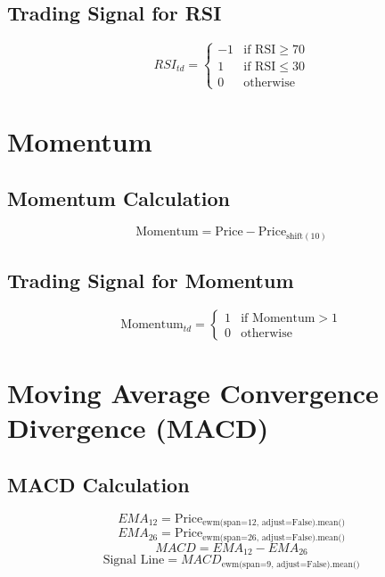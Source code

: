 \documentclass{article}
\begin{document}
\subsection{Trading Signal for RSI}
\begin{equation}
RSI_{td} = 
\begin{cases} 
-1 & \text{if RSI} \geq 70 \\
1 & \text{if RSI} \leq 30 \\
0 & \text{otherwise}
\end{cases}
\end{equation}

\section{Momentum}

\subsection{Momentum Calculation}
\begin{equation}
\text{Momentum} = \text{Price} - \text{Price}_{\text{shift}(10)}
\end{equation}

\subsection{Trading Signal for Momentum}
\begin{equation}
\text{Momentum}_{td} = 
\begin{cases} 
1 & \text{if Momentum} > 1 \\
0 & \text{otherwise}
\end{cases}
\end{equation}

\section{Moving Average Convergence Divergence (MACD)}

\subsection{MACD Calculation}
\begin{equation}
EMA_{12} = \text{Price}_{\text{ewm(span=12, adjust=False).mean()}}
\end{equation}
\begin{equation}
EMA_{26} = \text{Price}_{\text{ewm(span=26, adjust=False).mean()}}
\end{equation}
\begin{equation}
MACD = EMA_{12} - EMA_{26}
\end{equation}
\begin{equation}
\text{Signal Line} = MACD_{\text{ewm(span=9, adjust=False).mean()}}
\end{equation}
\end{document}

